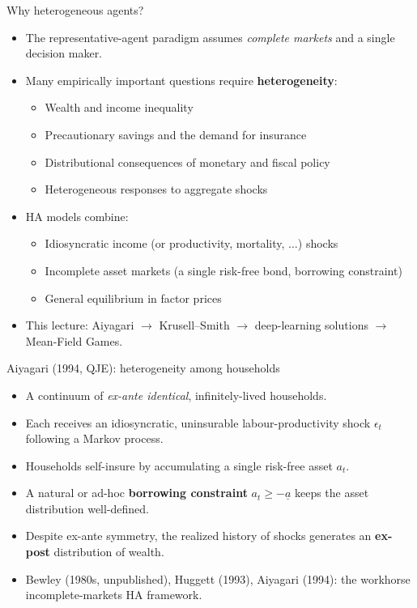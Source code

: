 \documentclass[10pt,english,aspectratio=169]{beamer}
\begin{document}
\begin{frame}{Why heterogeneous agents?}
\begin{itemize}
\item The representative-agent paradigm assumes \emph{complete markets} and a single decision maker.
\medskip
\item Many empirically important questions require \textbf{heterogeneity}:
  \begin{itemize}
  \item Wealth and income inequality
  \item Precautionary savings and the demand for insurance
  \item Distributional consequences of monetary and fiscal policy
  \item Heterogeneous responses to aggregate shocks
  \end{itemize}
\medskip
\item HA models combine:
  \begin{itemize}
  \item Idiosyncratic income (or productivity, mortality, $\ldots$) shocks
  \item Incomplete asset markets (a single risk-free bond, borrowing constraint)
  \item General equilibrium in factor prices
  \end{itemize}
\medskip
\item This lecture: Aiyagari $\to$ Krusell--Smith $\to$ deep-learning solutions $\to$ Mean-Field Games.
\end{itemize}
\end{frame}

\begin{frame}{Aiyagari (1994, QJE): heterogeneity among households}
\begin{itemize}
\item A continuum of \emph{ex-ante identical}, infinitely-lived households.
\medskip
\item Each receives an idiosyncratic, uninsurable labour-productivity shock $\epsilon_t$ following a Markov process.
\medskip
\item Households self-insure by accumulating a single risk-free asset $a_t$.
\medskip
\item A natural or ad-hoc \textbf{borrowing constraint} $a_t \geq -\underline{a}$ keeps the asset distribution well-defined.
\medskip
\item Despite ex-ante symmetry, the realized history of shocks generates an \textbf{ex-post} distribution of wealth.
\medskip
\item Bewley (1980s, unpublished), Huggett (1993), Aiyagari (1994): the workhorse incomplete-markets HA framework.
\end{itemize}
\end{frame}
\end{document}
